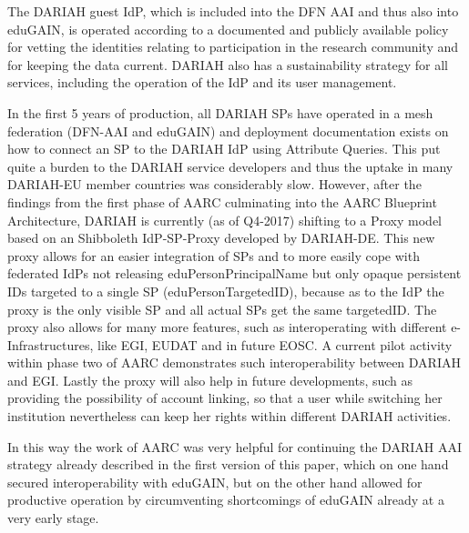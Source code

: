 \documentclass[fleqn,11pt]{wlscirep}
\begin{document}
{The DARIAH guest IdP, which is included into the DFN AAI and thus also into eduGAIN, is operated according to a documented and publicly available policy for vetting the identities relating to participation in the research community and for keeping the data current. DARIAH also has a sustainability strategy for all services, including the operation of the IdP and its user management. 

In the first 5 years of production, all DARIAH SPs have operated in a mesh federation (DFN-AAI and eduGAIN) and deployment documentation exists on how to connect an SP to the DARIAH IdP using Attribute Queries. This put quite a burden to the DARIAH service developers and thus the uptake in many DARIAH-EU member countries was considerably slow. However, after the findings from the first phase of AARC culminating into the AARC Blueprint Architecture, DARIAH is currently (as of Q4-2017) shifting to a Proxy model based on an Shibboleth IdP-SP-Proxy developed by DARIAH-DE. This new proxy  allows for an easier integration of SPs and to more easily cope with federated IdPs not releasing eduPersonPrincipalName but only opaque persistent IDs targeted to a single SP (eduPersonTargetedID), because as to the IdP the proxy is the only visible SP and all actual SPs get the same targetedID. The proxy also allows for many more features, such as interoperating with different e-Infrastructures, like EGI, EUDAT and in future EOSC. A current pilot activity within phase two of AARC demonstrates such interoperability between DARIAH and EGI. Lastly the proxy will also help in future developments, such as providing the possibility of account linking, so that a user while switching her institution nevertheless can keep her rights within different DARIAH activities. 

In this way the work of AARC was very helpful for continuing the DARIAH AAI\cite{dariahaai} strategy already described in the first version of this paper, which on one hand secured interoperability with eduGAIN, but on the other hand allowed for productive operation by circumventing shortcomings of eduGAIN already at a very early stage. 

}
\end{document}
